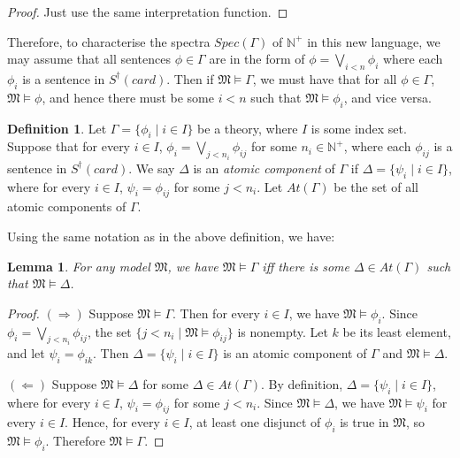 \documentclass[12pt, reqno]{amsart}
\newtheorem{lemma}[theorem]{Lemma}
\theoremstyle{definition}
\newtheorem{definition}[theorem]{Definition}
\theoremstyle{remark}
\numberwithin{equation}{section}
\begin{document}
\begin{proof}
	Just use the same interpretation function.
\end{proof}

Therefore, to characterise the spectra $Spec(\Gamma)$ of $\mathbb{N}^+$ in this new language, we may assume that all sentences $\phi \in \Gamma$ are in the form of $\phi = \bigvee_{i < n} \phi_i$ where each $\phi_i$ is a sentence in $S^{\dagger}(card)$. Then if $\mathfrak{M} \models \Gamma$, we must have that for all $\phi \in \Gamma$, $\mathfrak{M} \models \phi$, and hence there must be some $i < n$ such that $\mathfrak{M} \models \phi_i$, and vice versa.

\begin{definition}
Let $\Gamma=\{\phi_i\mid i\in I\}$ be a theory, where $I$ is some index set. Suppose that for every $i\in I$,
$\phi_i=\bigvee_{j<n_i}\phi_{ij}$ for some $n_i\in\mathbb N^+$, where each $\phi_{ij}$ is a sentence in $S^\dagger(card)$. We say $\Delta$ is an \textit{atomic component} of $\Gamma$ if $\Delta=\{\psi_i\mid i\in I\}$, where for every $i\in I$, $\psi_i=\phi_{ij}$ for some $j<n_i$. Let $At(\Gamma)$ be the set of all atomic components of $\Gamma$.
\end{definition}

Using the same notation as in the above definition, we have:

\begin{lemma}
For any model $\mathfrak M$, we have $\mathfrak M\models\Gamma$ iff there is some $\Delta\in At(\Gamma)$ such that $\mathfrak M\models\Delta$.
\end{lemma}

\begin{proof}
$(\Rightarrow)$ Suppose $\mathfrak M\models\Gamma$. Then for every $i\in I$, we have $\mathfrak M\models\phi_i$. Since $\phi_i=\bigvee_{j<n_i}\phi_{ij}$, the set $\{j<n_i\mid\mathfrak M\models\phi_{ij}\}$ is nonempty. Let $k$ be its least element, and let $\psi_i=\phi_{ik}$. Then $\Delta=\{\psi_i\mid i\in I\}$ is an atomic component of $\Gamma$ and $\mathfrak M\models\Delta$.

$(\Leftarrow)$ Suppose $\mathfrak M\models\Delta$ for some $\Delta\in At(\Gamma)$. By definition, $\Delta=\{\psi_i\mid i\in I\}$, where for every $i\in I$, $\psi_i=\phi_{ij}$ for some $j<n_i$. Since $\mathfrak M\models\Delta$, we have $\mathfrak M\models\psi_i$ for every $i\in I$. Hence, for every $i\in I$, at least one disjunct of $\phi_i$ is true in $\mathfrak M$, so $\mathfrak M\models\phi_i$. Therefore $\mathfrak M\models\Gamma$.
\end{proof}
\end{document}
